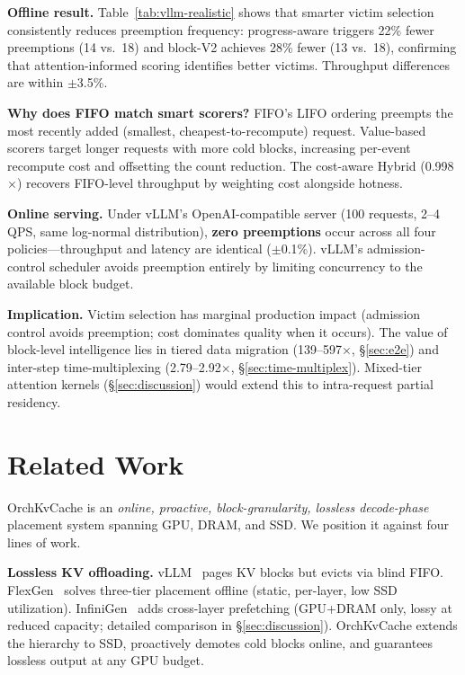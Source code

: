 \documentclass[conference]{IEEEtran}
\begin{document}
\textbf{Offline result.} Table~\ref{tab:vllm-realistic} shows that smarter victim selection consistently reduces preemption frequency: progress-aware triggers 22\% fewer preemptions (14 vs.\ 18) and block-V2 achieves 28\% fewer (13 vs.\ 18), confirming that attention-informed scoring identifies better victims. Throughput differences are within $\pm$3.5\%.

\textbf{Why does FIFO match smart scorers?} FIFO's LIFO ordering preempts the most recently added (smallest, cheapest-to-recompute) request. Value-based scorers target longer requests with more cold blocks, increasing per-event recompute cost and offsetting the count reduction. The cost-aware Hybrid (0.998$\times$) recovers FIFO-level throughput by weighting cost alongside hotness.

\textbf{Online serving.} Under vLLM's OpenAI-compatible server (100 requests, 2--4 QPS, same log-normal distribution), \textbf{zero preemptions} occur across all four policies---throughput and latency are identical ($\pm$0.1\%). vLLM's admission-control scheduler avoids preemption entirely by limiting concurrency to the available block budget.

\textbf{Implication.} Victim selection has marginal production impact (admission control avoids preemption; cost dominates quality when it occurs). The value of block-level intelligence lies in tiered data migration (139--597$\times$, \S\ref{sec:e2e}) and inter-step time-multiplexing (2.79--2.92$\times$, \S\ref{sec:time-multiplex}). Mixed-tier attention kernels (\S\ref{sec:discussion}) would extend this to intra-request partial residency.

\section{Related Work}

OrchKvCache is an \emph{online, proactive, block-granularity, lossless decode-phase} placement system spanning GPU, DRAM, and SSD. We position it against four lines of work.

\textbf{Lossless KV offloading.}
vLLM~\cite{vllm} pages KV blocks but evicts via blind FIFO. FlexGen~\cite{flexgen} solves three-tier placement offline (static, per-layer, low SSD utilization). InfiniGen~\cite{infinigen} adds cross-layer prefetching (GPU+DRAM only, lossy at reduced capacity; detailed comparison in \S\ref{sec:discussion}). OrchKvCache extends the hierarchy to SSD, proactively demotes cold blocks online, and guarantees lossless output at any GPU budget.
\end{document}
